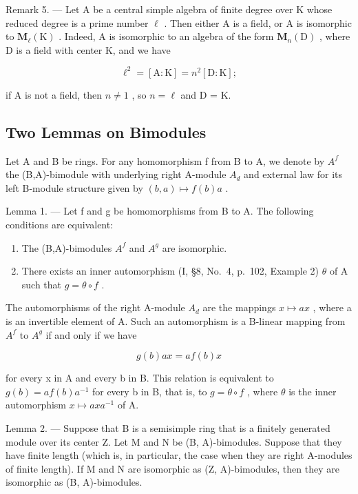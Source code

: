 Remark 5. --- Let A be a central simple algebra of finite degree over K whose reduced degree is a prime number \(\ell\) . Then either A is a field, or A is isomorphic to \(\mathbf{M}_{\ell}(\mathrm{K})\) . Indeed, A is isomorphic to an algebra of the form \(\mathbf{M}_{n}(\mathrm{D})\) , where D is a field with center K, and we have

\[
\ell^ {2} = [ \mathrm{A}: \mathrm{K} ] = n ^ {2} [ \mathrm{D}: \mathrm{K} ];
\]

if A is not a field, then \(n \neq 1\) , so \(n = \ell\) and D = K.

\subsection{Two Lemmas on Bimodules}

Let A and B be rings. For any homomorphism f from B to A, we denote by \(A^{f}\) the (B,A)-bimodule with underlying right A-module \(A_{d}\) and external law for its left B-module structure given by \((b,a)\mapsto f(b)a\) .

Lemma 1. --- Let f and g be homomorphisms from B to A. The following conditions are equivalent:

\begin{enumerate}
\def\labelenumi{(\roman{enumi})}
\item
  The (B,A)-bimodules \(A^{f}\) and \(A^{g}\) are isomorphic.
\item
  There exists an inner automorphism (I, §8, No.~4, p.~102, Example 2) \(\theta\) of A such that \(g = \theta \circ f\) .
\end{enumerate}

The automorphisms of the right A-module \(A_{d}\) are the mappings \(x \mapsto ax\) , where a is an invertible element of A. Such an automorphism is a B-linear mapping from \(A^{f}\) to \(A^{g}\) if and only if we have

\[
g (b) a x = a f (b) x
\]

for every x in A and every b in B. This relation is equivalent to \(g(b) = af(b)a^{-1}\) for every b in B, that is, to \(g = \theta \circ f\) , where \(\theta\) is the inner automorphism \(x \mapsto axa^{-1}\) of A.

Lemma 2. --- Suppose that B is a semisimple ring that is a finitely generated module over its center Z. Let M and N be (B, A)-bimodules. Suppose that they have finite length (which is, in particular, the case when they are right A-modules of finite length). If M and N are isomorphic as (Z, A)-bimodules, then they are isomorphic as (B, A)-bimodules.

